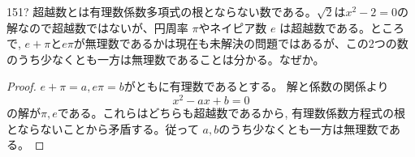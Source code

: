 \begin{prob}{151}{\hosi ?}{}
 超越数とは有理数係数多項式の根とならない数である。$\sqrt{2}$は$x^2-2=0$の解なので超越数ではないが、円周率 $\pi$やネイピア数 $e$ は超越数である。ところで, $e+\pi$と$e\pi$が無理数であるかは現在も未解決の問題ではあるが、この2つの数のうち少なくとも一方は無理数であることは分かる。なぜか。
\end{prob}

\begin{proof}
$e+\pi=a, e\pi =b$がともに有理数であるとする。 解と係数の関係より
\[x^2-ax+b=0\]
の解が$\pi ,e$である。これらはどちらも超越数であるから, 有理数係数方程式の根とならないことから矛盾する。従って $a,b$のうち少なくとも一方は無理数である。
\end{proof}
